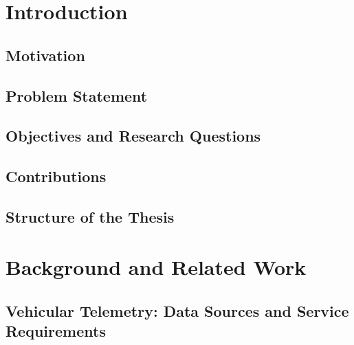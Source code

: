 

\chapter{Introduction}

\section{Motivation}
\section{Problem Statement}
\section{Objectives and Research Questions}
\section{Contributions}
\section{Structure of the Thesis}


\chapter{Background and Related Work}

\section{Vehicular Telemetry: Data Sources and Service Requirements}

